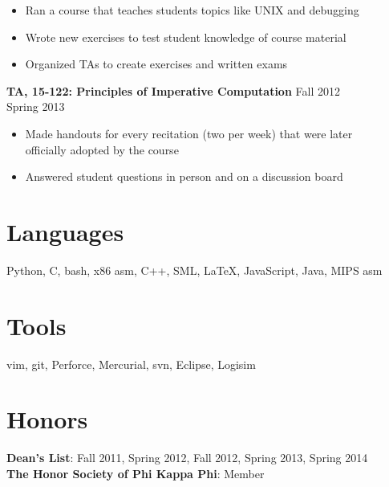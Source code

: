 \documentclass[margin]{res}
\begin{document}
\begin{resume}
  \vspace{-1em}\vspace{-1ex}
  \begin{itemize} \itemsep -2pt
    \item Ran a course that teaches students topics like UNIX and debugging
    \item Wrote new exercises to test student knowledge of course material
    \item Organized TAs to create exercises and written exams
  \end{itemize}

  \textbf{TA, 15-122: Principles of Imperative Computation}
    \hfill Fall 2012\\ \hphantom{1em} \hfill Spring 2013

  \vspace{-1em}\vspace{-1ex}
  \begin{itemize} \itemsep -2pt
    \item Made handouts for every recitation (two per week) that were later\\
      officially adopted by the course
    \item Answered student questions in person and on a discussion board
  \end{itemize}

\section{Languages}
  Python, C, bash, x86 asm, C++, SML, \LaTeX, JavaScript, Java, MIPS asm

\section{Tools}
  vim, git, Perforce, Mercurial, svn, Eclipse, Logisim

\section{Honors}
  \textbf{Dean's List}: Fall 2011, Spring 2012, Fall 2012, Spring 2013, Spring 2014 \\
  \textbf{The Honor Society of Phi Kappa Phi}: Member

\end{resume}
\end{document}
